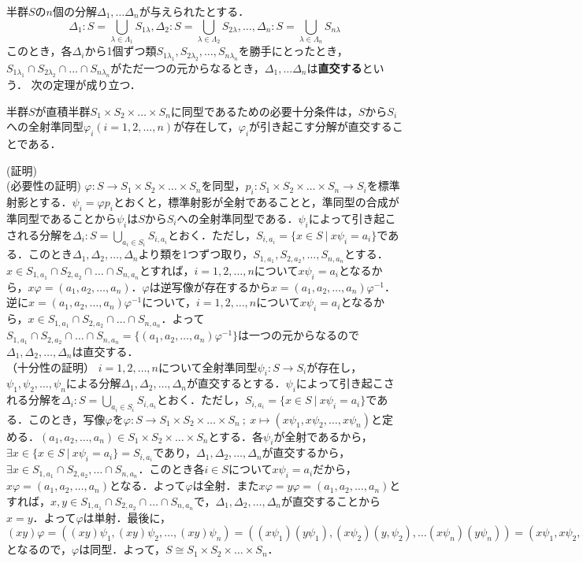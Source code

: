 半群$S$の$n$個の分解$\Delta_1,\dots\Delta_n$が与えられたとする．
$$
\Delta_1:S=\displaystyle\bigcup_{\lambda\in\Lambda_1}S_{1\lambda},\Delta_2:S=\displaystyle\bigcup_{\lambda\in\Lambda_2}S_{2\lambda},\dots,\Delta_n:S=\displaystyle\bigcup_{\lambda\in\Lambda_n} S_{n\lambda}
$$
このとき，各$\Delta_i$から1個ずつ類$S_{1\lambda_1},S_{2\lambda_2},\dots,S_{n\lambda_n}$を勝手にとったとき，$S_{1\lambda_1}\cap S_{2\lambda_2}\cap\dots\cap S_{n\lambda_n}$がただ一つの元からなるとき，$\Delta_1,\dots\Delta_n$は{\bf 直交する}という．
次の定理が成り立つ．
\begin{sthm}
半群$S$が直積半群$S_1\times S_2\times\dots \times S_n$に同型であるための必要十分条件は，$S$から$S_i$への全射準同型$\varphi_i(i=1,2,\dots,n)$が存在して，$\varphi_i$が引き起こす分解が直交することである．
\end{sthm}
(証明)\\
(必要性の証明)
$\varphi:S\rightarrow S_1\times S_2\times\dots\times S_n$を同型，$p_i:S_1\times S_2\times\dots\times S_n\rightarrow S_i$を標準射影とする．$\psi_i=\varphi p_i$とおくと，標準射影が全射であることと，準同型の合成が準同型であることから$\psi_i$は$S$から$S_i$への全射準同型である．$\psi_i$によって引き起こされる分解を$\Delta_i:S=\displaystyle\bigcup_{a_i\in S_i}S_{i,a_i}$とおく．ただし，$S_{i,a_i}=\{x\in S\:|\:x\psi_i=a_i\}$である．このとき$\Delta_1,\Delta_2,\dots,\Delta_n$より類を1つずつ取り，$S_{1,a_1},S_{2,a_2},\dots,S_{n,a_n}$とする．$x\in S_{1,a_1}\cap S_{2,a_2}\cap\dots\cap S_{n,a_n}$とすれば，$i=1,2,\dots,n$について$x\psi_i=a_i$となるから，$x\varphi=(a_1,a_2,\dots,a_n)$．$\varphi$は逆写像が存在するから$x=(a_1,a_2,\dots,a_n)\varphi^{-1}$．逆に$x=(a_1,a_2,\dots,a_n)\varphi^{-1}$について，$i=1,2,\dots,n$について$x\psi_i=a_i$となるから，$x\in S_{1,a_1}\cap S_{2,a_2}\cap\dots\cap S_{n,a_n}$．よって$S_{1,a_1}\cap S_{2,a_2}\cap\dots\cap S_{n,a_n}=\{(a_1,a_2,\dots,a_n)\varphi^{-1}\}$は一つの元からなるので$\Delta_1,\Delta_2,\dots,\Delta_n$は直交する．\\
（十分性の証明）
$i=1,2,\dots,n$について全射準同型$\psi_i:S\rightarrow S_i$が存在し，$\psi_1,\psi_2,\dots,\psi_n$による分解$\Delta_1,\Delta_2,\dots,\Delta_n$が直交するとする．$\psi_i$によって引き起こされる分解を$\Delta_i:S=\displaystyle\bigcup_{a_i\in S_i}S_{i,a_i}$とおく．ただし，$S_{i,a_i}=\{x\in S\:|\:x\psi_i=a_i\}$である．このとき，写像$\varphi$を$\varphi:S\rightarrow S_1\times S_2\times \dots\times S_n\:;\:x\mapsto (x\psi_1,x\psi_2,\dots,x\psi_n)$と定める．$(a_1,a_2,\dots,a_n)\in S_1\times S_2\times\dots\times S_n$とする．各$\psi_i$が全射であるから，$\exists x\in \{x\in S\:|\:x\psi_i=a_i\}=S_{i,a_i}$であり，$\Delta_1,\Delta_2,\dots,\Delta_n$が直交するから，$\exists x\in S_{1,a_1}\cap S_{2,a_2},\dots\cap S_{n,a_n}$．このとき各$i\in S$について$x\psi_i=a_i$だから，$x\varphi=(a_1,a_2,\dots,a_n)$となる．よって$\varphi$は全射．また$x\varphi=y\varphi=(a_1,a_2,\dots,a_n)$とすれば，$x,y\in S_{1,a_1}\cap S_{2,a_2}\cap\dots\cap S_{n,a_n}$で，$\Delta_1,\Delta_2,\dots,\Delta_n$が直交することから$x=y$．よって$\varphi$は単射．最後に，$(xy)\varphi=((xy)\psi_1,(xy)\psi_2,\dots,(xy)\psi_n)=((x\psi_1)(y\psi_1),(x\psi_2)(y,\psi_2),\dots(x\psi_n)(y\psi_n))=(x\psi_1,x\psi_2,\dots,x\psi_n)(y\psi_1,y\psi_2,\dots,y\psi_n)$となるので，$\varphi$は同型．よって，$S\cong S_1\times S_2\times\dots\times S_n$．
